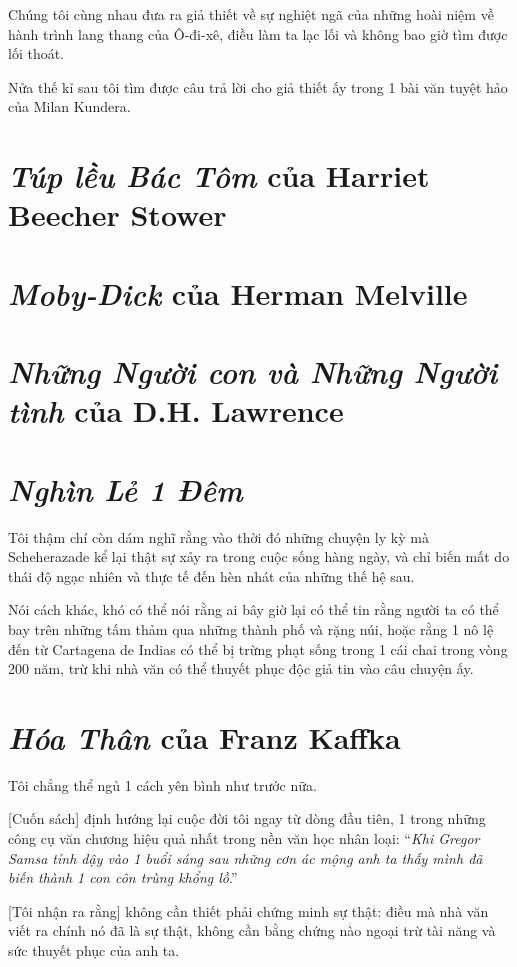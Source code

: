 \documentclass{book}
\numberwithin{equation}{section}
\begin{document}
Chúng tôi cùng nhau đưa ra giả thiết về sự nghiệt ngã của những hoài niệm về hành trình lang thang của Ô-đi-xê, điều làm ta lạc lối và không bao giờ tìm được lối thoát.

Nửa thế kỉ sau tôi tìm được câu trả lời cho giả thiết ấy trong 1 bài văn tuyệt hảo của Milan Kundera.

\section{\textit{Túp lều Bác Tôm} của Harriet Beecher Stower}

\section{\textit{Moby-Dick} của Herman Melville}

\section{\textit{Những Người con và Những Người tình} của D.H. Lawrence}

\section{\textit{Nghìn Lẻ 1 Đêm}}
Tôi thậm chí còn dám nghĩ rằng vào thời đó những chuyện ly kỳ mà Scheherazade kể lại thật sự xảy ra trong cuộc sống hàng ngày, và chỉ biến mất do thái độ ngạc nhiên và thực tế đến hèn nhát của những thế hệ sau.

Nói cách khác, khó có thể nói rằng ai bây giờ lại có thể tin rằng người ta có thể bay trên những tấm thảm qua những thành phố và rặng núi, hoặc rằng 1 nô lệ đến từ Cartagena de Indias có thể bị trừng phạt sống trong 1 cái chai trong vòng 200 năm, trừ khi nhà văn có thể thuyết phục độc giả tin vào câu chuyện ấy.

\section{\textit{Hóa Thân} của Franz Kaffka}
Tôi chẳng thể ngủ 1 cách yên bình như trước nữa.

[Cuốn sách] định hướng lại cuộc đời tôi ngay từ dòng đầu tiên, 1 trong những công cụ văn chương hiệu quả nhất trong nền văn học nhân loại: ``\textit{Khi Gregor Samsa tỉnh dậy vào 1 buổi sáng sau những cơn ác mộng anh ta thấy mình đã biến thành 1 con côn trùng khổng lồ}.''

[Tôi nhận ra rằng] không cần thiết phải chứng minh sự thật: điều mà nhà văn viết ra chính nó đã là sự thật, không cần bằng chứng nào ngoại trừ tài năng và sức thuyết phục của anh ta.
\end{document}
